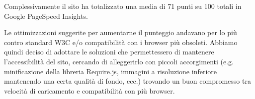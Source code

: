 Complessivamente il sito ha totalizzato una media di 71 punti su 100 totali in Google PageSpeed Insights.

Le ottimizzazioni suggerite per aumentarne il punteggio andavano per lo più
contro standard W3C e/o compatibilità con i browser più obsoleti. Abbiamo
quindi deciso di adottare le soluzioni che permettessero di mantenere
l'accessibilità del sito, cercando di alleggerirlo con piccoli accorgimenti
(e.g. minificazione della libreria Require.js, immagini a risoluzione
inferiore mantenendo una certa qualità di fondo, ecc.) trovando un buon
compromesso tra velocità di caricamento e compatibilità con più browser.